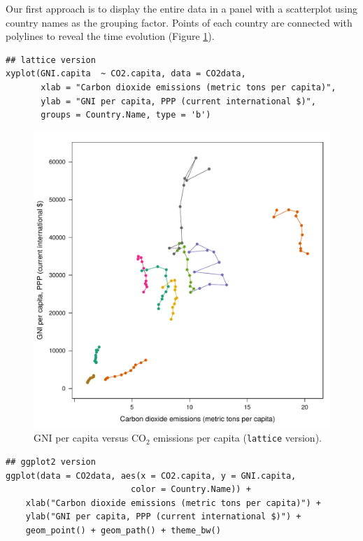 \documentclass[smallroyalvopaper]{memoir}
\begin{document}

Our first approach is to display the entire data in a panel with a
scatterplot using country names as the grouping factor. Points of each
country are connected with polylines to reveal the time evolution
(Figure \ref{fig:CO2-GNI}).
\lstset{language=r,label= ,caption= ,captionpos=b,numbers=none}
\begin{lstlisting}
## lattice version
xyplot(GNI.capita  ~ CO2.capita, data = CO2data,
       xlab = "Carbon dioxide emissions (metric tons per capita)",
       ylab = "GNI per capita, PPP (current international $)",
       groups = Country.Name, type = 'b')
\end{lstlisting}

\begin{figure}[htbp]
\centering
\includegraphics[width=.9\linewidth]{figs/CO2_GNI.pdf}
\caption{GNI per capita versus \(\mathrm{CO_2}\) emissions per capita (\texttt{lattice} version). \label{fig:CO2-GNI}}
\end{figure}

\lstset{language=r,label= ,caption= ,captionpos=b,numbers=none}
\begin{lstlisting}
## ggplot2 version
ggplot(data = CO2data, aes(x = CO2.capita, y = GNI.capita,
                         color = Country.Name)) +
    xlab("Carbon dioxide emissions (metric tons per capita)") +
    ylab("GNI per capita, PPP (current international $)") +
    geom_point() + geom_path() + theme_bw()
\end{lstlisting}
\end{document}
